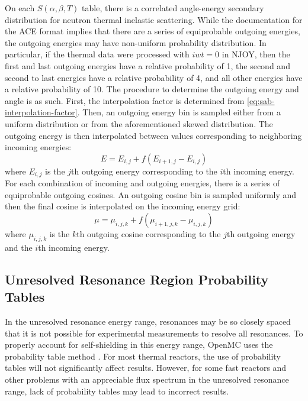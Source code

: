On each $S(\alpha,\beta,T)$ table, there is a correlated angle-energy secondary
distribution for neutron thermal inelastic scattering. While the documentation
for the ACE format \cite{lanl-x5-2008-ace} implies that there are a series of
equiprobable outgoing energies, the outgoing energies may have non-uniform
probability distribution. In particular, if the thermal data were processed with
$iwt = 0$ in NJOY, then the first and last outgoing energies have a relative
probability of 1, the second and second to last energies have a relative
probability of 4, and all other energies have a relative probability of 10. The
procedure to determine the outgoing energy and angle is as such. First, the
interpolation factor is determined from
\eqref{eq:sab-interpolation-factor}. Then, an outgoing energy bin is sampled
either from a uniform distribution or from the aforementioned skewed
distribution. The outgoing energy is then interpolated between values
corresponding to neighboring incoming energies:
\begin{equation}
  \label{eq:inelastic-energy}
  E = E_{i,j} + f (E_{i+1,j} - E_{i,j})
\end{equation}
where $E_{i,j}$ is the $j$th outgoing energy corresponding to the $i$th incoming
energy. For each combination of incoming and outgoing energies, there is a
series of equiprobable outgoing cosines. An outgoing cosine bin is sampled
uniformly and then the final cosine is interpolated on the incoming energy grid:
\begin{equation}
  \label{eq:inelastic-angle}
  \mu = \mu_{i,j,k} + f (\mu_{i+1,j,k} - \mu_{i,j,k})
\end{equation}
where $\mu_{i,j,k}$ is the $k$th outgoing cosine corresponding to the $j$th
outgoing energy and the $i$th incoming energy.

\subsection{Unresolved Resonance Region Probability Tables}

In the unresolved resonance energy range, resonances may be so closely spaced
that it is not possible for experimental measurements to resolve all
resonances. To properly account for self-shielding in this energy range, OpenMC
uses the probability table method \cite{nse-levitt-1972}. For most thermal
reactors, the use of probability tables will not significantly affect
results. However, for some fast reactors and other problems with an appreciable
flux spectrum in the unresolved resonance range, lack of probability tables may
lead to incorrect results.

